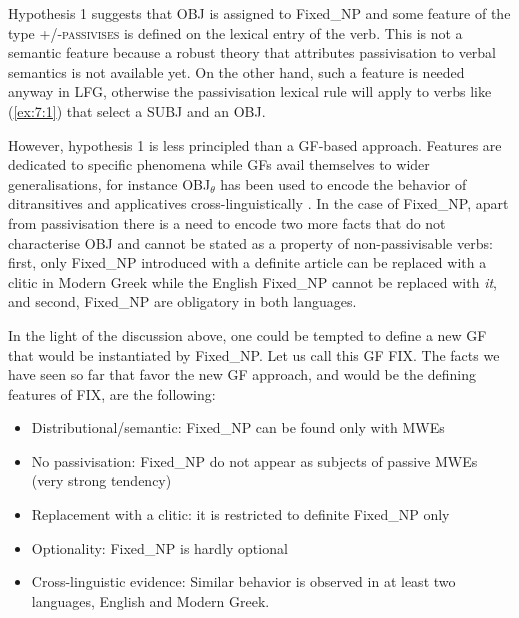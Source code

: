 \documentclass[output=paper]{langsci/langscibook}
\begin{document}
Hypothesis 1 suggests that OBJ is assigned to Fixed\_NP and some feature of the type \textsc{+/-passivises} is defined on the lexical entry of the verb. This is not a semantic feature because a robust theory that attributes passivisation to verbal semantics is not available yet. On the other hand, such a feature is needed anyway in LFG, otherwise the passivisation lexical rule will apply to verbs like  (\ref{ex:7:1}) that select a SUBJ and an OBJ. 

However, hypothesis 1 is less principled than a GF-based approach. Features are dedicated to specific phenomena while GFs avail themselves to wider generalisations, for instance OBJ$_\theta$ has been used to encode the behavior of ditransitives and applicatives cross-linguistically \citep{bresnanmoshi1990}.  In the case of Fixed\_NP, apart from passivisation there is a need to encode two more facts that do not characterise OBJ and cannot be stated as a property of non-passivisable verbs: first, only Fixed\_NP introduced with a definite article can be replaced with a clitic in Modern Greek while the English Fixed\_NP cannot be replaced with \textit{it}, and second,  Fixed\_NP are obligatory in both languages.

In the light of the discussion above, one could be tempted to define a new GF that would be instantiated by Fixed\_NP. Let us call this GF FIX. The facts we have seen so far that favor the new GF approach, and would be the defining features of FIX, are the following: 

\begin{itemize}
\item Distributional/semantic: Fixed\_NP can be found only with MWEs 
\item No passivisation: Fixed\_NP do not appear as subjects of passive MWEs (very strong tendency)
\item Replacement with a clitic: it is restricted to definite Fixed\_NP only
\item Optionality: Fixed\_NP is hardly optional
\item Cross-linguistic evidence: Similar behavior is observed in at least two languages, English and Modern Greek.
\end{itemize}
\end{document}
